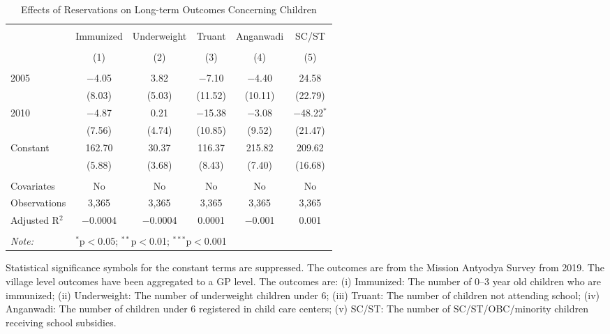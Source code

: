 \begin{table}[!htbp]
\centering
\begin{threeparttable}

  \caption{Effects of Reservations on Long-term Outcomes Concerning Children} 
  \label{raj_shrug_children_05_10} 
\scriptsize 
\begin{tabular}{@{\extracolsep{0pt}}lccccc} 
\\[-1.8ex]\hline 
\hline \\[-1.8ex] 
 & Immunized & Underweight & Truant & Anganwadi & SC/ST \\ 
\\[-1.8ex] & (1) & (2) & (3) & (4) & (5)\\ 
\hline \\[-1.8ex] 
 2005 & $-$4.05 & 3.82 & $-$7.10 & $-$4.40 & 24.58 \\ 
  & (8.03) & (5.03) & (11.52) & (10.11) & (22.79) \\ 
  2010 & $-$4.87 & 0.21 & $-$15.38 & $-$3.08 & $-$48.22$^{*}$ \\ 
  & (7.56) & (4.74) & (10.85) & (9.52) & (21.47) \\ 
  Constant & 162.70 & 30.37 & 116.37 & 215.82 & 209.62 \\ 
  & (5.88) & (3.68) & (8.43) & (7.40) & (16.68) \\ 
 \hline \\[-1.8ex] 
Covariates & No & No & No & No & No \\ 
Observations & 3,365 & 3,365 & 3,365 & 3,365 & 3,365 \\ 
Adjusted R$^{2}$ & $-$0.0004 & $-$0.0004 & 0.0001 & $-$0.001 & 0.001 \\ 
\hline 
\hline \\[-1.8ex] 
\textit{Note:}  & \multicolumn{5}{l}{$^{*}$p$<$0.05; $^{**}$p$<$0.01; $^{***}$p$<$0.001} \\ 
\end{tabular} 
\begin{tablenotes}[flushleft]
\scriptsize
\item Statistical significance symbols for the constant terms are suppressed. The outcomes are from the Mission Antyodya Survey from 2019. 
                   The village level outcomes have been aggregated to a GP level. The outcomes are:
                    (i) Immunized: The number of 0--3 year old children who are immunized;
                    (ii) Underweight: The number of underweight children under 6;
                    (iii) Truant: The number of children not attending school;
                    (iv) Anganwadi: The number of children under 6 registered in child care centers;
                    (v) SC/ST: The number of SC/ST/OBC/minority children receiving school subsidies.
\end{tablenotes}
\end{threeparttable}
\end{table}
